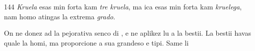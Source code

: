 \begin{VUpage}[148]{144}
\textit{Kruela} esas min forta kam \textit{tre kruela}, ma ica esas min\nl
forta kam \textit{kruelega}, nam homo  atingas la extrema\nl
\textit{grado}. \nl
{}\nl
{}\nl
{}

On ne donez ad  la pejorativa senco di , e ne\nl
aplikez lu a la bestii. La bestii havas   quale la\nl
homi, ma proporcione a sua grandeso e tipi. Same li \parplein
\end{VUpage}

